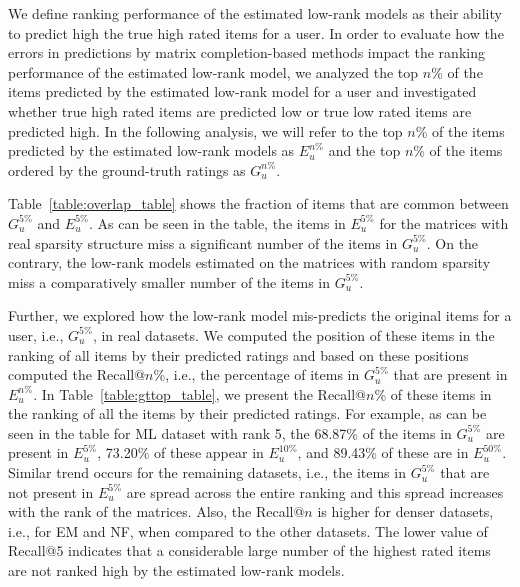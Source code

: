 We define ranking performance of the estimated low-rank models as their ability
to predict high the true high rated items for a user.
In order to evaluate how the errors in predictions by matrix completion-based
methods impact the ranking performance of
the estimated low-rank model, we analyzed the top $n$\% of the items predicted by
the estimated low-rank model for a user and investigated whether true high rated items are predicted low or
true low rated items are predicted high. In the following analysis, we will
refer to the top $n$\% of the items predicted by the estimated low-rank
models as $E_{u}^{n\%}$ and the top $n$\% of the items ordered by
the ground-truth ratings as $G_{u}^{n\%}$. 

Table~\ref{table:overlap_table} shows the fraction of items that are common between $G_{u}^{5\%}$ 
and $E_{u}^{5\%}$. 
As can be seen in the table, the items in $E_{u}^{5\%}$ for the matrices with real sparsity
structure miss a significant number of the items in $G_{u}^{5\%}$.
On the contrary, the low-rank models estimated on the matrices with random
sparsity miss a comparatively smaller number of the items in $G_{u}^{5\%}$.

Further, we explored how the low-rank model mis-predicts the original \topf items
for a user, i.e., $G_{u}^{5\%}$, in real datasets. 
We computed the position of these items in the ranking of all items by their
predicted ratings and based on these positions computed the Recall@$n$\%, i.e.,
the percentage of items in $G_{u}^{5\%}$ that are  present in $E_{u}^{n\%}$.
In Table~\ref{table:gttop_table}, we present the Recall@$n$\% of these items in the
ranking of all the items by their predicted ratings.  
For example, as can be seen in the table for ML dataset with rank 5, 
the 68.87\% of the items in $G_{u}^{5\%}$ are present in $E_{u}^{5\%}$, 
73.20\% of these appear in $E_{u}^{10\%}$, and
89.43\% of these are in $E_{u}^{50\%}$. 
Similar trend occurs for the remaining datasets, i.e., the
items in $G_{u}^{5\%}$ that are not present in $E_{u}^{5\%}$ are spread across
the entire ranking and this spread increases with the rank of the matrices. 
Also, the Recall@$n$ is higher for denser datasets, i.e., for EM and NF, when compared to the other datasets.
The lower value of Recall@$5$ indicates that a considerable large number of the highest
rated items are not ranked high by the estimated low-rank models. 


